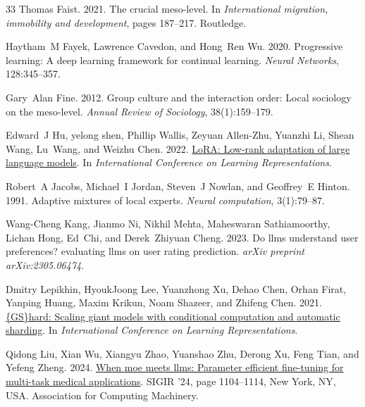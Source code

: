 \documentclass[11pt]{article}
\begin{document}
\begin{thebibliography}{33}
Thomas Faist. 2021.
\newblock The crucial meso-level.
\newblock In \emph{International migration, immobility and development}, pages 187--217. Routledge.

Haytham~M Fayek, Lawrence Cavedon, and Hong~Ren Wu. 2020.
\newblock Progressive learning: A deep learning framework for continual learning.
\newblock \emph{Neural Networks}, 128:345--357.

Gary~Alan Fine. 2012.
\newblock Group culture and the interaction order: Local sociology on the meso-level.
\newblock \emph{Annual Review of Sociology}, 38(1):159--179.

Edward~J Hu, yelong shen, Phillip Wallis, Zeyuan Allen-Zhu, Yuanzhi Li, Shean Wang, Lu~Wang, and Weizhu Chen. 2022.
\newblock \href {https://openreview.net/forum?id=nZeVKeeFYf9} {Lo{RA}: Low-rank adaptation of large language models}.
\newblock In \emph{International Conference on Learning Representations}.

Robert~A Jacobs, Michael~I Jordan, Steven~J Nowlan, and Geoffrey~E Hinton. 1991.
\newblock Adaptive mixtures of local experts.
\newblock \emph{Neural computation}, 3(1):79--87.

Wang-Cheng Kang, Jianmo Ni, Nikhil Mehta, Maheswaran Sathiamoorthy, Lichan Hong, Ed~Chi, and Derek~Zhiyuan Cheng. 2023.
\newblock Do llms understand user preferences? evaluating llms on user rating prediction.
\newblock \emph{arXiv preprint arXiv:2305.06474}.

Dmitry Lepikhin, HyoukJoong Lee, Yuanzhong Xu, Dehao Chen, Orhan Firat, Yanping Huang, Maxim Krikun, Noam Shazeer, and Zhifeng Chen. 2021.
\newblock \href {https://openreview.net/forum?id=qrwe7XHTmYb} {{\{}GS{\}}hard: Scaling giant models with conditional computation and automatic sharding}.
\newblock In \emph{International Conference on Learning Representations}.

Qidong Liu, Xian Wu, Xiangyu Zhao, Yuanshao Zhu, Derong Xu, Feng Tian, and Yefeng Zheng. 2024.
\newblock \href {https://doi.org/10.1145/3626772.3657722} {When moe meets llms: Parameter efficient fine-tuning for multi-task medical applications}.
\newblock SIGIR '24, page 1104–1114, New York, NY, USA. Association for Computing Machinery.


\end{thebibliography}
\end{document}
